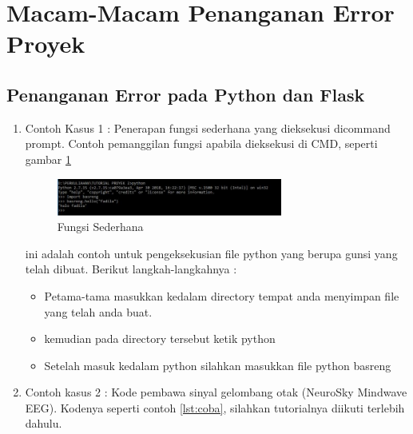 \section{Macam-Macam Penanganan Error Proyek}

\subsection{Penanganan Error pada Python dan Flask}
\begin{enumerate}
  \item Contoh Kasus 1 : Penerapan fungsi sederhana yang dieksekusi dicommand prompt. Contoh pemanggilan fungsi apabila dieksekusi di CMD, seperti gambar \ref{fig:contohsederhana}

  \begin{figure}[!ht]
        \centerline{\includegraphics[width=0.70\textwidth]{figures/10/contohsederhana.jpg}}
	    \caption{Fungsi Sederhana}
	    \label{fig:contohsederhana}
  \end{figure}


ini adalah contoh untuk pengeksekusian file python yang berupa gunsi yang telah dibuat. Berikut langkah-langkahnya :
    \begin{itemize}
        \item Petama-tama masukkan kedalam directory tempat anda menyimpan file yang telah anda buat.
        \item kemudian pada directory tersebut ketik python
        \item Setelah masuk kedalam python silahkan masukkan file python basreng
    \end{itemize}

  \item Contoh kasus 2 : Kode pembawa sinyal gelombang otak (NeuroSky Mindwave EEG). Kodenya seperti contoh \ref{lst:coba}, silahkan tutorialnya diikuti terlebih dahulu.

\end{enumerate}

